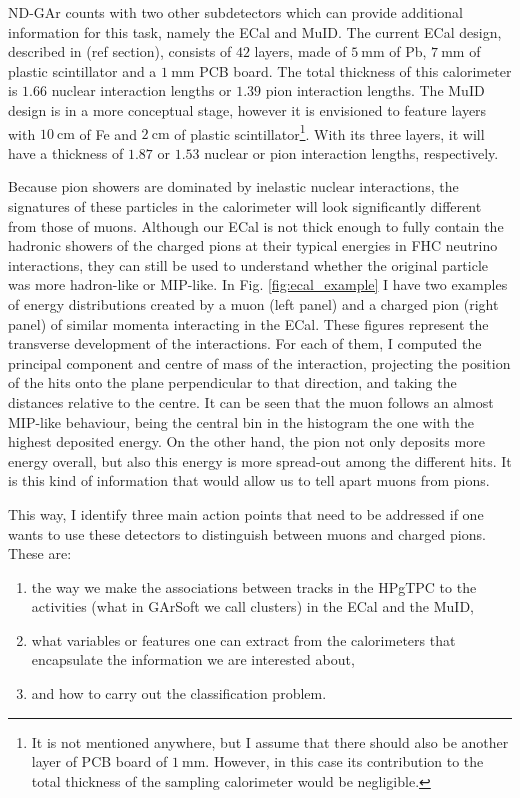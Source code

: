 ND-GAr counts with two other subdetectors which can provide additional information for this task, namely the ECal and MuID. The current ECal design, described in (ref section), consists of $42$ layers, made of $5~\mathrm{mm}$ of Pb, $7~\mathrm{mm}$ of plastic scintillator and a $1~\mathrm{mm}$ PCB board. The total thickness of this calorimeter is $1.66$ nuclear interaction lengths or $1.39$ pion interaction lengths. The MuID design is in a more conceptual stage, however it is envisioned to feature layers with $10~\mathrm{cm}$ of Fe and $2~\mathrm{cm}$ of plastic scintillator\footnote{It is not mentioned anywhere, but I assume that there should also be another layer of PCB board of $1~\mathrm{mm}$. However, in this case its contribution to the total thickness of the sampling calorimeter would be negligible.}. With its three layers, it will have a thickness of $1.87$ or $1.53$ nuclear or pion interaction lengths, respectively.

Because pion showers are dominated by inelastic nuclear interactions, the signatures of these particles in the calorimeter will look significantly different from those of muons. Although our ECal is not thick enough to fully contain the hadronic showers of the charged pions at their typical energies in FHC neutrino interactions, they can still be used to understand whether the original particle was more hadron-like or MIP-like. In Fig. \ref{fig:ecal_example} I have two examples of energy distributions created by a muon (left panel) and a charged pion (right panel) of similar momenta interacting in the ECal. These figures represent the transverse development of the interactions. For each of them, I computed the principal component and centre of mass of the interaction, projecting the position of the hits onto the plane perpendicular to that direction, and taking the distances relative to the centre. It can be seen that the muon follows an almost MIP-like behaviour, being the central bin in the histogram the one with the highest deposited energy. On the other hand, the pion not only deposits more energy overall, but also this energy is more spread-out among the different hits. It is this kind of information that would allow us to tell apart muons from pions.

This way, I identify three main action points that need to be addressed if one wants to use these detectors to distinguish between muons and charged pions. These are:
\begin{enumerate}
	\item the way we make the associations between tracks in the HPgTPC to the activities (what in GArSoft we call clusters) in the ECal and the MuID,
	\item what variables or features one can extract from the calorimeters that encapsulate the information we are interested about,
	\item and how to carry out the classification problem.
\end{enumerate}

